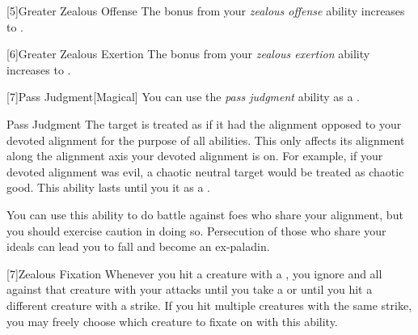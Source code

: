         [5]{Greater Zealous Offense} The bonus from your \textit{zealous offense} ability increases to .

        [6]{Greater Zealous Exertion} The bonus from your \textit{zealous exertion} ability increases to .

        [7]{Pass Judgment}[Magical] You can use the \textit{pass judgment} ability as a .
        \begin{freeability}{Pass Judgment}
            The target is treated as if it had the alignment opposed to your devoted alignment for the purpose of all abilities.
            This only affects its alignment along the alignment axis your devoted alignment is on.
            For example, if your devoted alignment was evil, a chaotic neutral target would be treated as chaotic good.
            This ability lasts until you  it as a .

            You can use this ability to do battle against foes who share your alignment, but you should exercise caution in doing so.
            Persecution of those who share your ideals can lead you to fall and become an ex-paladin.
        \end{freeability}

        [7]{Zealous Fixation} Whenever you hit a creature with a , you ignore  and all  against that creature with your attacks until you take a  or until you hit a different creature with a strike.
        If you hit multiple creatures with the same strike, you may freely choose which creature to fixate on with this ability.


